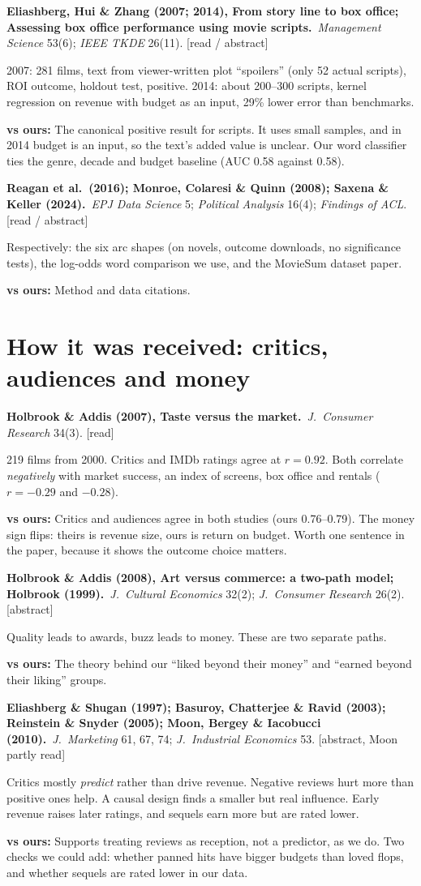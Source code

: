 \documentclass[10pt]{article}
\newcommand{\paper}[2]{\par\smallskip\textbf{#1}\ #2\par}
\newcommand{\vs}[1]{\par{\color{accent}\textbf{vs ours:}} #1\par}
\newcommand{\src}[1]{{\small\color{muted}[#1]}}
\begin{document}
\paper{Eliashberg, Hui \& Zhang (2007; 2014), From story line to box office; Assessing box office performance using movie scripts.}{\textit{Management Science} 53(6); \textit{IEEE TKDE} 26(11). \src{read / abstract}}
2007: 281 films, text from viewer-written plot ``spoilers'' (only 52 actual scripts), ROI outcome, holdout test, positive. 2014: about 200--300 scripts, kernel regression on revenue with budget as an input, 29\% lower error than benchmarks.
\vs{The canonical positive result for scripts. It uses small samples, and in 2014 budget is an input, so the text's added value is unclear. Our word classifier ties the genre, decade and budget baseline (AUC 0.58 against 0.58).}

\paper{Reagan et al.\ (2016); Monroe, Colaresi \& Quinn (2008); Saxena \& Keller (2024).}{\textit{EPJ Data Science} 5; \textit{Political Analysis} 16(4); \textit{Findings of ACL}. \src{read / abstract}}
Respectively: the six arc shapes (on novels, outcome downloads, no significance tests), the log-odds word comparison we use, and the MovieSum dataset paper.
\vs{Method and data citations.}

\section{How it was received: critics, audiences and money}

\paper{Holbrook \& Addis (2007), Taste versus the market.}{\textit{J.\ Consumer Research} 34(3). \src{read}}
219 films from 2000. Critics and IMDb ratings agree at $r = 0.92$. Both correlate \emph{negatively} with market success, an index of screens, box office and rentals ($r = -0.29$ and $-0.28$).
\vs{Critics and audiences agree in both studies (ours 0.76--0.79). The money sign flips: theirs is revenue size, ours is return on budget. Worth one sentence in the paper, because it shows the outcome choice matters.}

\paper{Holbrook \& Addis (2008), Art versus commerce: a two-path model; Holbrook (1999).}{\textit{J.\ Cultural Economics} 32(2); \textit{J.\ Consumer Research} 26(2). \src{abstract}}
Quality leads to awards, buzz leads to money. These are two separate paths.
\vs{The theory behind our ``liked beyond their money'' and ``earned beyond their liking'' groups.}

\paper{Eliashberg \& Shugan (1997); Basuroy, Chatterjee \& Ravid (2003); Reinstein \& Snyder (2005); Moon, Bergey \& Iacobucci (2010).}{\textit{J.\ Marketing} 61, 67, 74; \textit{J.\ Industrial Economics} 53. \src{abstract, Moon partly read}}
Critics mostly \emph{predict} rather than drive revenue. Negative reviews hurt more than positive ones help. A causal design finds a smaller but real influence. Early revenue raises later ratings, and sequels earn more but are rated lower.
\vs{Supports treating reviews as reception, not a predictor, as we do. Two checks we could add: whether panned hits have bigger budgets than loved flops, and whether sequels are rated lower in our data.}
\end{document}
